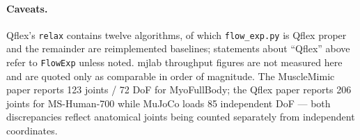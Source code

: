 \documentclass[11pt,a4paper]{article}
\begin{document}
\paragraph{Caveats.} Qflex's \texttt{relax} contains twelve algorithms, of which
\texttt{flow\_exp.py} is Qflex proper and the remainder are reimplemented baselines;
statements about ``Qflex'' above refer to \texttt{FlowExp} unless noted. mjlab throughput
figures are not measured here and are quoted only as comparable in order of magnitude.
The MuscleMimic paper reports 123 joints / 72 DoF for MyoFullBody; the Qflex paper reports
206 joints for MS-Human-700 while MuJoCo loads 85 independent DoF --- both discrepancies
reflect anatomical joints being counted separately from independent coordinates.
\end{document}
